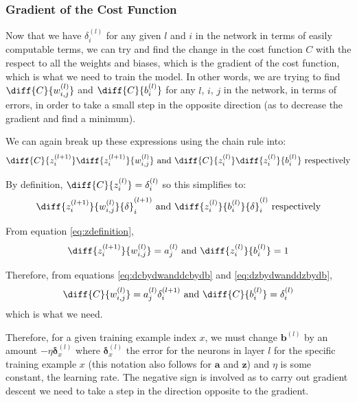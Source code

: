 \documentclass[12pt]{report}
\begin{document}
\subsubsection{Gradient of the Cost Function}
Now that we have ${\delta}^{\left(l\right)}_i$ for any given $l$ and $i$ in the network in terms of easily computable terms, we can try and find the change in the cost function $C$ with the respect to all the weights and biases, which is the gradient of the cost function, which is what we need to train the model. In other words, we are trying to find $\diff{C}{w^{\left(l\right)}_{i,j}}$ and $\diff{C}{b^{\left(l\right)}_i}$ for any $l$, $i$, $j$ in the network, in terms of errors, in order to take a small step in the opposite direction (as to decrease the gradient and find a minimum).

We can again break up these expressions using the chain rule into:
\begin{equation}
    \diff{C}{z^{\left(l+1\right)}_i}\diff{z^{\left(l+1\right)}_i}{w^{\left(l\right)}_{i,j}} \text{ and } \diff{C}{z^{\left(l\right)}_i}\diff{z^{\left(l\right)}_i}{b^{\left(l\right)}_i} \text{ respectively}
\end{equation}

By definition, $\diff{C}{z^{\left(l\right)}_i}={\delta}^{\left(l\right)}_i$ so this simplifies to:
\begin{equation}\label{eq:dcbydwanddcbydb}
    \diff{z^{\left(l+1\right)}_i}{w^{\left(l\right)}_{i,j}}{\delta}^{\left(l+1\right)}_i \text{ and } \diff{z^{\left(l\right)}_i}{b^{\left(l\right)}_i}{\delta}^{\left(l\right)}_i \text{ respectively}
\end{equation}

From equation \ref{eq:zdefinition},
\begin{equation}\label{eq:dzbydwanddzbydb}
    \diff{z^{\left(l+1\right)}_i}{w^{\left(l\right)}_{i,j}}=a^{\left(l\right)}_j \text{ and } \diff{z^{\left(l\right)}_i}{b^{\left(l\right)}_i}=1
\end{equation}

Therefore, from equations \ref{eq:dcbydwanddcbydb} and \ref{eq:dzbydwanddzbydb},
\begin{equation}
    \diff{C}{w^{\left(l\right)}_{i,j}}=a^{\left(l\right)}_{j}{\delta}^{\left(l+1\right)}_i \text{ and } \diff{C}{b^{\left(l\right)}_i}={\delta}^{\left(l\right)}_i
\end{equation}
which is what we need.

Therefore, for a given training example index $x$, we must change $\mathbf{b}^{\left(l\right)}$ by an amount $-\eta \bm{\delta}^{\left(l\right)}_x$ where $\bm{\delta}^{\left(l\right)}_x$ the error for the neurons in layer $l$ for the specific training example $x$ (this notation also follows for $\mathbf{a}$ and $\mathbf{z}$) and $\eta$ is some constant, the learning rate. The negative sign is involved as to carry out gradient descent we need to take a step in the direction opposite to the gradient.
\end{document}
